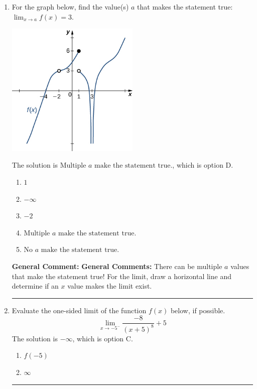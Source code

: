 \documentclass{extbook}[14pt]
\newcommand{\litem}[1]{\item #1

\rule{\textwidth}{0.4pt}}
\begin{document}
\begin{enumerate}\litem{
For the graph below, find the value(s) $a$ that makes the statement true: $ \displaystyle \lim_{x \rightarrow a} f(x) = 3$.

\begin{center}
    \includegraphics[width=0.5\textwidth]{../Figures/evaluateLimitGraphicallyA.png}
\end{center}


The solution is \( \text{Multiple } a \text{ make the statement true}. \), which is option D.\begin{enumerate}[label=\Alph*.]
\item \( 1 \)


\item \( -\infty \)


\item \( -2 \)


\item \( \text{Multiple } a \text{ make the statement true}. \)


\item \( \text{No } a \text{ make the statement true}. \)


\end{enumerate}

\textbf{General Comment:} \textbf{General Comments:} There can be multiple $a$ values that make the statement true! For the limit, draw a horizontal line and determine if an $x$ value makes the limit exist.
}
\litem{
Evaluate the one-sided limit of the function $f(x)$ below, if possible.
\[ \lim_{x \rightarrow -5^-} \frac{-8}{(x+5)^8}+5 \]The solution is \( -\infty \), which is option C.\begin{enumerate}[label=\Alph*.]
\item \( f(-5) \)


\item \( \infty \)



\end{enumerate}}
\end{enumerate}
\end{document}

